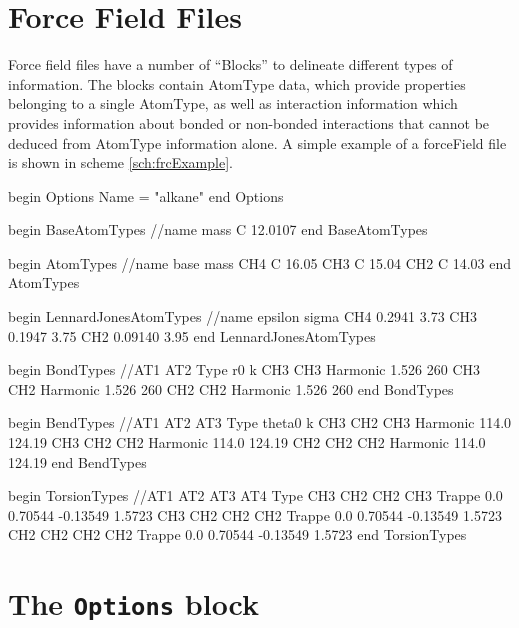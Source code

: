 \documentclass[letterpaper]{report}
\begin{document}
\section{\label{section:frcFile}Force Field Files}

Force field files have a number of ``Blocks'' to delineate different
types of information.  The blocks contain AtomType data, which provide
properties belonging to a single AtomType, as well as interaction
information which provides information about bonded or non-bonded
interactions that cannot be deduced from AtomType information alone.
A simple example of a forceField file is shown in scheme
\ref{sch:frcExample}.

\begin{code}[caption={[An example of a complete OpenMD
 force field file for straight-chain united-atom alkanes.] An example
 showing a complete OpenMD force field for straight-chain united-atom
 alkanes.}, label={sch:frcExample}] 
begin Options 
  Name = "alkane" 
end Options

begin BaseAtomTypes  
//name          mass  
C               12.0107
end BaseAtomTypes

begin AtomTypes
//name  base    mass
CH4	C	16.05		
CH3	C	15.04		
CH2	C	14.03		
end AtomTypes

begin LennardJonesAtomTypes
//name          epsilon         sigma
CH4       	0.2941          3.73
CH3       	0.1947          3.75
CH2       	0.09140         3.95
end LennardJonesAtomTypes

begin BondTypes
//AT1       AT2 Type                    r0              k
CH3	    CH3	Harmonic		1.526		260
CH3	    CH2	Harmonic		1.526		260
CH2	    CH2	Harmonic		1.526		260
end BondTypes

begin BendTypes
//AT1   AT2     AT3     Type            theta0   k
CH3     CH2     CH3     Harmonic        114.0    124.19
CH3     CH2     CH2     Harmonic        114.0    124.19
CH2     CH2     CH2     Harmonic        114.0    124.19
end BendTypes

begin TorsionTypes
//AT1 AT2  AT3  AT4  Type    
CH3   CH2  CH2  CH3  Trappe  0.0  0.70544  -0.13549  1.5723
CH3   CH2  CH2  CH2  Trappe  0.0  0.70544  -0.13549  1.5723  
CH2   CH2  CH2  CH2  Trappe  0.0  0.70544  -0.13549  1.5723  
end TorsionTypes
\end{code}

\section{\label{section:ffOptions}The {\tt Options} block}
\end{document}
